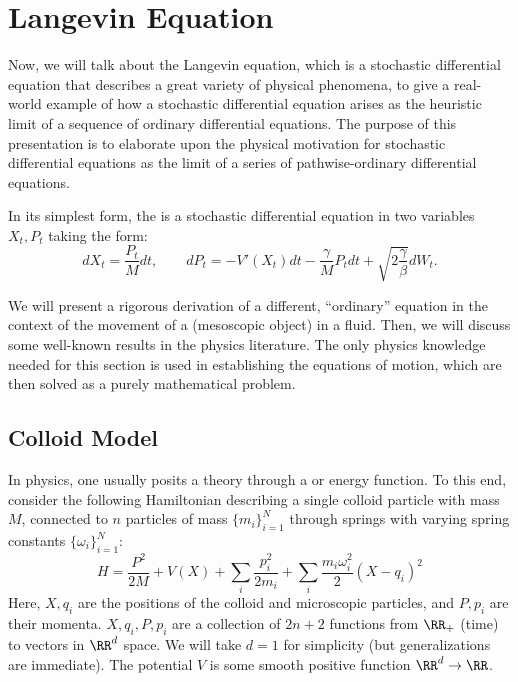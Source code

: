 \documentclass{scrartcl}
\begin{document}
\appendix

\section{Langevin Equation}

Now, we will talk about the Langevin equation, which is a stochastic differential equation that describes a great variety of physical phenomena, to give a real-world example of how a stochastic differential equation arises as the heuristic limit of a sequence of ordinary differential equations. The purpose of this presentation is to elaborate upon the physical motivation for stochastic differential equations as the limit of a series of pathwise-ordinary differential equations.

\begin{defn}
    In its simplest form, the  is a stochastic differential equation in two variables $X_t, P_t$ taking the form:
    \[
        dX_t = \frac{P_t}{M}dt, \qquad dP_t = -V'(X_t)dt - \frac{\gamma}{M} P_tdt + \sqrt{2\frac{\gamma}{\beta}} dW_t.    
    \]
\end{defn}


We will present a rigorous derivation of a different, ``ordinary'' equation in the context of the movement of a  (mesoscopic object) in a fluid. Then, we will discuss some well-known results in the physics literature. The only physics knowledge needed for this section is used in establishing the equations of motion, which are then solved as a purely mathematical problem.

\subsection{Colloid Model}
In physics, one usually posits a theory through a  or energy function. To this end, consider the following Hamiltonian describing a single colloid particle with mass $M$, connected to $n$ particles of mass $\{m_i\}_{i = 1}^N$ through springs with varying spring constants $\{\omega_i\}_{i = 1}^N$:
\[
    H = \frac{P^2}{2M} + V(X) + \sum_i \frac{p_i^2}{2m_i} + \sum_i \frac{m_i\omega_i^2}{2} {(X-q_i)}^2
\]
Here, $X, q_i$ are the positions of the colloid and microscopic particles, and $P, p_i$ are their momenta. $X, q_i, P, p_i$ are a collection of $2n+2$ functions from $\RR_+$ (time) to vectors in $\RR^d$ space. We will take $d = 1$ for simplicity (but generalizations are immediate). The potential $V$ is some smooth positive function $\RR^d\to \RR$.
\end{document}
